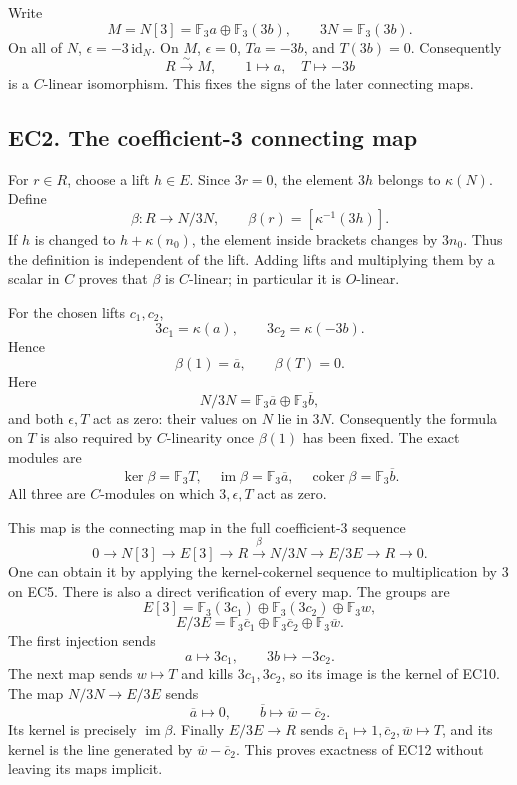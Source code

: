 \documentclass[
  10pt,
]{article}
\begin{document}
Write \[
M=N[3]=\mathbb F_3a\oplus\mathbb F_3(3b),\qquad
3N=\mathbb F_3(3b).
\tag{EC7}
\] On all of \(N\), \(\epsilon=-3\,\mathrm{id}_N\). On \(M\),
\(\epsilon=0\), \(Ta=-3b\), and \(T(3b)=0\). Consequently \[
R\xrightarrow{\sim}M,\qquad 1\mapsto a,\quad T\mapsto-3b
\tag{EC8}
\] is a \(C\)-linear isomorphism. This fixes the signs of the later
connecting maps.

\subsection{EC2. The coefficient-3 connecting
map}\label{ec2.-the-coefficient-3-connecting-map}

For \(r\in R\), choose a lift \(h\in E\). Since \(3r=0\), the element
\(3h\) belongs to \(\kappa(N)\). Define \[
\beta:R\longrightarrow N/3N,\qquad
\beta(r)=[\kappa^{-1}(3h)].
\tag{EC9}
\] If \(h\) is changed to \(h+\kappa(n_0)\), the element inside brackets
changes by \(3n_0\). Thus the definition is independent of the lift.
Adding lifts and multiplying them by a scalar in \(C\) proves that
\(\beta\) is \(C\)-linear; in particular it is \(O\)-linear.

For the chosen lifts \(c_1,c_2\), \[
3c_1=\kappa(a),\qquad 3c_2=\kappa(-3b).
\] Hence \[
\boxed{\beta(1)=\overline a,\qquad\beta(T)=0.}
\tag{EC10}
\] Here \[
N/3N=\mathbb F_3\overline a\oplus\mathbb F_3\overline b,
\] and both \(\epsilon,T\) act as zero: their values on \(N\) lie in
\(3N\). Consequently the formula on \(T\) is also required by
\(C\)-linearity once \(\beta(1)\) has been fixed. The exact modules are
\[
\ker\beta=\mathbb F_3T,\quad
\operatorname{im}\beta=\mathbb F_3\overline a,\quad
\operatorname{coker}\beta=\mathbb F_3\overline b.
\tag{EC11}
\] All three are \(C\)-modules on which \(3,\epsilon,T\) act as zero.

This map is the connecting map in the full coefficient-3 sequence \[
0\to N[3]\to E[3]\to R
\xrightarrow{\beta}N/3N\to E/3E\to R\to0.
\tag{EC12}
\] One can obtain it by applying the kernel-cokernel sequence to
multiplication by 3 on EC5. There is also a direct verification of every
map. The groups are \[
E[3]=\mathbb F_3(3c_1)\oplus\mathbb F_3(3c_2)\oplus\mathbb F_3w,
\] \[
E/3E=\mathbb F_3\overline c_1\oplus
\mathbb F_3\overline c_2\oplus\mathbb F_3\overline w.
\] The first injection sends \[
a\mapsto3c_1,\qquad3b\mapsto-3c_2.
\] The next map sends \(w\mapsto T\) and kills \(3c_1,3c_2\), so its
image is the kernel of EC10. The map \(N/3N\to E/3E\) sends \[
\overline a\mapsto0,\qquad
\overline b\mapsto\overline w-\overline c_2.
\] Its kernel is precisely \(\operatorname{im}\beta\). Finally
\(E/3E\to R\) sends
\(\overline c_1\mapsto1,\overline c_2,\overline w\mapsto T\), and its
kernel is the line generated by \(\overline w-\overline c_2\). This
proves exactness of EC12 without leaving its maps implicit.
\end{document}
